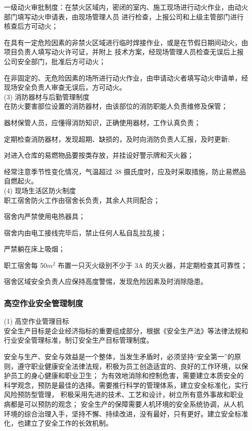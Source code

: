  一级动火审批制度：在禁火区域内，密闭的室内、施工现场进行动火作业，由动火部门填写动火申请表，由现场管理人员
进行检查，上报公司和上级主管部门进行核查后方可动火；

 在具有一定危险因素的非禁火区域进行临时焊接作业，或是在节假日期间动火，由项目负责人填写动火许可证，并附上
技术方案，经现场管理人员检查无误后上报公司安全部门，批准后方可动火；

 在非固定的、无危险因素的场所进行动火作业，由申请动火者填写动火申请单，经现场安全负责人审查无误后，方可动火。\\

(3) 消防器材与后勤管理制度\\

 在防火要害部位设置的消防器材，由该部位的消防职能人负责维修及保管；

 器材保管人员，应懂得消防知识，正确使用器材，工作认真负责；

 定期检查消防器材，发现超期、缺损的，及时向消防负责人汇报，及时更新;

 对进入仓库的易燃物品要按类存放，并挂设好警示牌和灭火器；

 经常注意季节性变化情况，气温超过 38 摄氏度时，应及时采取措施，防止易燃品自燃起火。\\

(4) 现场生活区防火制度\\

 职工宿舍防火工作由宿舍长负责，其余人共同配合；

 宿舍内严禁使用电热器具；

 宿舍内由电工接线完毕后，禁止任何人私自乱拉乱接；

 严禁躺在床上吸烟；

 职工宿舍每 50$m^2$ 布置一只灭火级别不少于 3A 的灭火器，并定期检查其可靠性；

 宿舍区域安全负责人应保持高度警惕，发现危险因素及时消除隐患。\\

\subsubsection{高空作业安全管理制度}

(1) 高空作业管理目标\\

安全生产目标是企业经济指标的重要组成部分，根据《安全生产法》等法律法规和行业安全管理标准，制订安全生产目标管理制度。

安全与生产、安全与效益是一个整体，当发生矛盾时，必须坚持“安全第一”的原则，遵守职业健康安全法律法规，积极为员工创造适宜的、良好的工作环境，以保护员工的身心健康和职业卫生；
为有效地消除和控制危害，需要建立本质安全的科学观念，预防是最佳的选择。需要推行科学的管理体系，建立安全标准化，实行风险预防型管理，
积极采用先进的技术、工艺和设计，树立所有意外事故和职业病都是可以预防的观念；
安全生产的保障需要人机环境的安全系统协调，从人机环境的综合治理入手，坚持不懈、持续改进，没有最好，只有更好。建立安全标准化，也建立了安全工作的长效机制。\\

